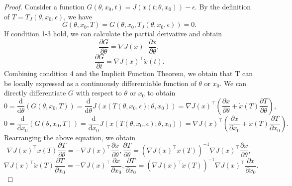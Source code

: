 \documentclass{article}
\newcommand{\dd}{\mathrm{d}}
\begin{document}
\begin{proof}
    Consider a function $G(\theta,x_0,t)=J(x(t;\theta,x_0))-\epsilon$. By the definition of $T=T_J(\theta,x_0,\epsilon)$, we have 
    \[
    G(\theta,x_0,T) = G(\theta,x_0,T_J(\theta,x_0,\epsilon)) = 0.
    \]
    If condition 1-3 hold, we can calculate the partial derivative and obtain \[
    \frac{\partial G}{\partial \theta}=\nabla J(x)^\top\frac{\partial x}{\partial \theta},
    \]
    \[
    \frac{\partial G}{\partial t} = \nabla J(x)^\top\dot{x}(t). 
    \]
    Combining condition 4 and the Implicit Function Theorem, we obtain that T can be locally expressed as a continuously differentiable function of $\theta$ or $x_0$. We can directly differentiate $G$ with respect to $\theta$ or $x_0$ to obtain \[
    0 = \frac{\dd}{\dd\theta}(G(\theta,x_0,T))=
    \frac{\dd}{\dd\theta}J(x(T(\theta,x_0,\epsilon);\theta,x_0))=
    \nabla J(x)^\top
    (\frac{\partial x}{\partial \theta} + \dot{x}(T)\frac{\partial T}{\partial \theta}),
    \]
    \[
    0 = \frac{\dd}{\dd x_0}(G(\theta,x_0,T))=
    \frac{\dd}{\dd x_0}J(x(T(\theta,x_0,\epsilon);\theta,x_0))=
    \nabla J(x)^\top
    (\frac{\partial x}{\partial x_0} + \dot{x}(T)\frac{\partial T}{\partial x_0}).
    \]
    Rearranging the above equation, we obtain 
    \[\nabla J(x)^\top\dot{x}(T)\frac{\partial T}{\partial \theta}=
    -\nabla J(x)^\top\frac{\partial x}{\partial \theta},
    \frac{\partial T}{\partial \theta}=
    \left(\nabla J(x)^\top\dot{x}(T)\right)^{-1}\nabla J(x)^\top\frac{\partial x}{\partial \theta},\]
    \[\nabla J(x)^\top\dot{x}(T)\frac{\partial T}{\partial x_0}=
    -\nabla J(x)^\top\frac{\partial x}{\partial x_0},
    \frac{\partial T}{\partial x_0}=
    \left(\nabla J(x)^\top\dot{x}(T)\right)^{-1}\nabla J(x)^\top\frac{\partial x}{\partial x_0}.\]
    
\end{proof}
\fi
\end{document}
